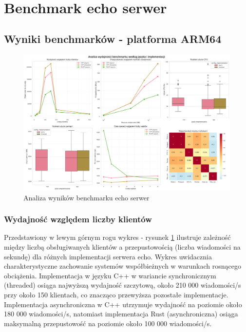 \section{Benchmark echo serwer}

\subsection{Wyniki benchmarków - platforma ARM64}

\begin{figure}[H]
    \centering
    \includegraphics[width=\textwidth]{analiza/images/conc/echo/arm/analiza_benchmarku.png}
    \caption{Analiza wyników benchmarku echo serwer}
    \label{analiza_benchmarku_echo_serwer}
\end{figure}
\subsubsection{Wydajność względem liczby klientów}
Przedstawiony w lewym górnym rogu wykres - rysunek \ref{analiza_benchmarku_echo_serwer} ilustruje zależność między liczbą obsługiwanych klientów a przepustowością (liczba wiadomości na sekundę) dla różnych implementacji serwera echo. Wykres uwidacznia charakterystyczne zachowanie systemów współbieżnych w warunkach rosnącego obciążenia. Implementacja w języku C++ w wariancie synchronicznym (threaded) osiąga najwyższą wydajność szczytową, około 210 000 wiadomości/s przy około 150 klientach, co znacząco przewyższa pozostałe implementacje. Implementacja asynchroniczna w C++ utrzymuje wydajność na poziomie około 180 000 wiadomości/s, natomiast implementacja Rust (asynchroniczna) osiąga maksymalną przepustowość na poziomie około 100 000 wiadomości/s.

